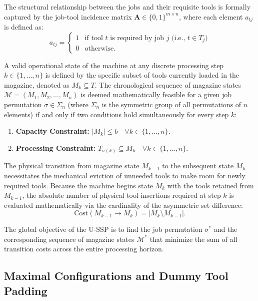\documentclass[11pt, a4paper]{book}
\begin{document}
	The structural relationship between the jobs and their requisite tools is formally captured by the job-tool incidence matrix $\mathbf{A} \in \{0,1\}^{m \times n}$, where each element $a_{tj}$ is defined as:
	\begin{equation}
		a_{tj} = 
		\begin{cases} 
			1 & \text{if tool } t \text{ is required by job } j \text{ (i.e., } t \in T_j) \\
			0 & \text{otherwise.}
		\end{cases}
	\end{equation}
	
	A valid operational state of the machine at any discrete processing step $k \in \{1, \dots, n\}$ is defined by the specific subset of tools currently loaded in the magazine, denoted as $M_k \subseteq T$. The chronological sequence of magazine states $\mathcal{M} = (M_1, M_2, \dots, M_n)$ is deemed mathematically feasible for a given job permutation $\sigma \in \Sigma_n$ (where $\Sigma_n$ is the symmetric group of all permutations of $n$ elements) if and only if two conditions hold simultaneously for every step $k$:
	\begin{enumerate}
		\item \textbf{Capacity Constraint:} $|M_k| \le b \quad \forall k \in \{1, \dots, n\}$.
		\item \textbf{Processing Constraint:} $T_{\sigma(k)} \subseteq M_k \quad \forall k \in \{1, \dots, n\}$.
	\end{enumerate}
	
	The physical transition from magazine state $M_{k-1}$ to the subsequent state $M_k$ necessitates the mechanical eviction of unneeded tools to make room for newly required tools. Because the machine begins state $M_k$ with the tools retained from $M_{k-1}$, the absolute number of physical tool insertions required at step $k$ is evaluated mathematically via the cardinality of the asymmetric set difference:
	\begin{equation}
		\text{Cost}(M_{k-1} \to M_k) = |M_k \setminus M_{k-1}|.
	\end{equation}
	
	The global objective of the U-SSP is to find the job permutation $\sigma^*$ and the corresponding sequence of magazine states $\mathcal{M}^*$ that minimize the sum of all transition costs across the entire processing horizon.
	
	\subsection{Maximal Configurations and Dummy Tool Padding}
	
\end{document}
